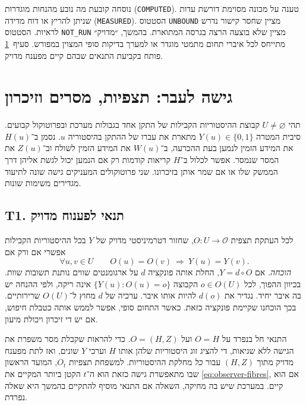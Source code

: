 \documentclass[11pt,a4paper]{article}
\DeclareRobustCommand{\textenglish}[1]{\foreignlanguage{english}{#1}}
\theoremstyle{definition}
\begin{document}
נוסחה קובעת מה נובע מהנחות מוגדרות (\textenglish{\texttt{COMPUTED}}). טענה על מכונה מסוימת דורשת עדות שניתן להריץ או דוח מדידה (\textenglish{\texttt{MEASURED}}). הסטטוס \textenglish{\texttt{UNBOUND}} מציין שחסר קישור נדרש לראיות. הסטטוס \textenglish{\texttt{NOT\_RUN}} מציין שלא בוצעה הרצה בגרסה המתוארת. בהמשך, ״מדויק״ מתייחס לכל איברי תחום מתמטי מוגדר או למערך בדיקות סופי המצוין במפורש. סעיף~\ref{sec:observer-theory} פותח בקביעת התנאים שבהם קיים מפענח מדויק.

\section{גישה לעבר: תצפיות, מסרים וזיכרון}
\label{sec:observer-theory}

תהי $U\ne\varnothing$ קבוצת ההיסטוריות הקבילות של התקן אחד בגבולות מערכת ובפרוטוקול קבועים. סיבית המטרה $Y(u)\in\{0,1\}$ מתארת את עברו של ההתקן בהיסטוריה $u$. נסמן ב־$H(u)$ את המידע הזמין לנמען בעת ההכרעה, ב־$W(u)$ את המידע הזמין לשולח וב־$Z(u)$ את המסר שנמסר. אפשר לכלול ב־$H$ קריאות קודמות רק אם הנמען יכול לגשת אליהן דרך הממשק שלו או אם שמר אותן בזיכרונו. שני פרוטוקולים המעניקים גישה שונה לתיעוד מגדירים משימות שונות.

\subsection{\textenglish{T1}. תנאי לפענוח מדויק}
\label{thm:observer-t1}

לכל העתקת תצפית $O:U\to\mathcal O$, שחזור דטרמיניסטי מדויק של $Y$ בכל ההיסטוריות הקבילות אפשרי אם ורק אם
\begin{equation}
 \forall u,v\in U\qquad O(u)=O(v)\ \Longrightarrow\ Y(u)=Y(v).
 \label{eq:observer-fibres}
\end{equation}
\emph{הוכחה.} אם $Y=d\circ O$, החלת אותה פונקציה $d$ על ארגומנטים שווים נותנת תשובות שוות. בכיוון ההפוך, לכל $o\in O(U)$ הקבוצה $\{Y(u):O(u)=o\}$ אינה ריקה, ולפי ההנחה יש בה איבר יחיד. נגדיר את $d(o)$ להיות אותו איבר. ערכיה של $d$ מחוץ ל־$O(U)$ שרירותיים. בכך הוכחנו שקיימת פונקציה כזאת. כאשר התחום סופי, אפשר לממש אותה כטבלת חיפוש, אם יש די זיכרון ויכולת מיעון.

התנאי חל בנפרד על $O=H$ ועל $O=(H,Z)$. כדי להראות שקבלת מסר משפרת את הגישה ללא שגיאות, די להציג זוג היסטוריות שלהן אותו $H$ וערכי $Y$ שונים, ואז לתת מפענח מדויק מתוך $(H,Z)$ עבור \emph{כל} מחלקת ההיסטוריות. למשפחת תצפיות $O_t$, המועד הראשון שבו מתאפשרת גישה כזאת הוא ה־$t$ הקטן ביותר המקיים את \eqref{eq:observer-fibres}, אם הוא קיים. במערכת שיש בה מחיקה, השאלה אם התנאי מוסיף להתקיים בהמשך היא שאלה נפרדת.
\end{document}
